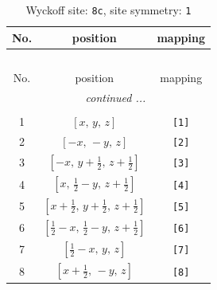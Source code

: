 \documentclass[fleqn,8pt]{jsarticle}
\begin{document}
\renewcommand{\arraystretch}{1.2}
\begin{longtable}{ccc}
\caption{Wyckoff site: {\tt 8c}, site symmetry: {\tt 1}}
 \\
 \hline \hline
No. & position & mapping \\ \hline \endfirsthead

\multicolumn{2}{l}{\tablename\ \thetable{}} \\
 \hline \hline
No. & position & mapping \\ \hline \endhead

 \hline \hline
\multicolumn{2}{r}{\footnotesize\it continued ...} \\ \endfoot

 \hline \hline
\multicolumn{2}{r}{} \\ \endlastfoot

1 & $\left[ x,\, y,\, z \right]$ & {\tt [1]} \\ \hline
2 & $\left[ - x,\, - y,\, z \right]$ & {\tt [2]} \\ \hline
3 & $\left[ - x,\, y + \frac{1}{2},\, z + \frac{1}{2} \right]$ & {\tt [3]} \\ \hline
4 & $\left[ x,\, \frac{1}{2} - y,\, z + \frac{1}{2} \right]$ & {\tt [4]} \\ \hline
5 & $\left[ x + \frac{1}{2},\, y + \frac{1}{2},\, z + \frac{1}{2} \right]$ & {\tt [5]} \\ \hline
6 & $\left[ \frac{1}{2} - x,\, \frac{1}{2} - y,\, z + \frac{1}{2} \right]$ & {\tt [6]} \\ \hline
7 & $\left[ \frac{1}{2} - x,\, y,\, z \right]$ & {\tt [7]} \\ \hline
8 & $\left[ x + \frac{1}{2},\, - y,\, z \right]$ & {\tt [8]} \\
\end{longtable}
\end{document}
